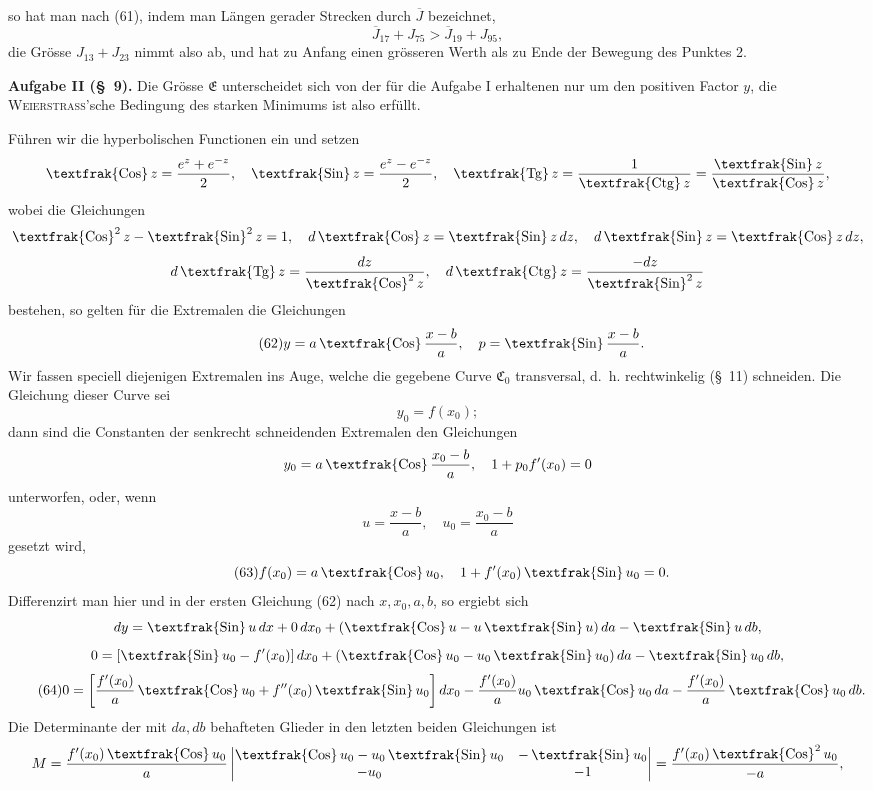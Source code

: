 \documentclass[11pt,a4paper,leqno]{article}
\newcommand{\Cof}{\mathop{\text{\textfrak{Cos}}}\nolimits}
\newcommand{\Sin}{\mathop{\text{\textfrak{Sin}}}\nolimits}
\newcommand{\Tg}{\mathop{\text{\textfrak{Tg}}}\nolimits}
\newcommand{\Ctg}{\mathop{\text{\textfrak{Ctg}}}\nolimits}
\begin{document}
 so hat man nach (61), indem man Längen gerader Strecken durch $\overline{J}$ bezeichnet,
\[
\overline{J}_{17}+J_{75}>\overline{J}_{19}+J_{95},
\]
die Grösse $J_{13}+J_{23}$ nimmt also ab, und hat zu Anfang einen grösseren Werth als zu Ende der Bewegung des Punktes 2.



\noindent\textbf{Aufgabe II (\S~9).} Die Grösse $\mathfrak{E}$ unterscheidet sich von der für die Aufgabe I erhaltenen nur um den positiven Factor $y$, die \textsc{Weierstrass}'sche Bedingung des starken Minimums ist also erfüllt.

Führen wir die hyperbolischen Functionen ein und setzen
\[
\Cof z=\frac{e^z+e^{-z}}{2},\quad
\Sin z=\frac{e^z-e^{-z}}{2},\quad
\Tg z=\frac{1}{\Ctg z}=\frac{\Sin z}{\Cof z},
\]
wobei die Gleichungen
\[
\Cof^2z-\Sin^2z=1,\quad
d\Cof z=\Sin z\,dz,\quad
d\Sin z=\Cof z\,dz,
\]
\[
d\Tg z=\frac{dz}{\Cof^2z},\quad
d\Ctg z=\frac{-dz}{\Sin^2z}
\]
bestehen, so gelten für die Extremalen die Gleichungen
\begin{equation}\tag{62}
y=a\Cof\frac{x-b}{a},\quad
p=\Sin\frac{x-b}{a}.
\end{equation}
Wir fassen speciell diejenigen Extremalen ins Auge, welche die gegebene Curve $\mathfrak{C}_0$ transversal, d.~h. rechtwinkelig (\S~11) schneiden. Die Gleichung dieser Curve sei
\[
y_0=f(x_0);
\]
dann sind die Constanten der senkrecht schneidenden Extremalen den Gleichungen
\[
y_0=a\Cof\frac{x_0-b}{a},\quad
1+p_0f'(x_0)=0
\]
unterworfen, oder, wenn
\[
u=\frac{x-b}{a},\quad u_0=\frac{x_0-b}{a}
\]
gesetzt wird,
\begin{equation}\tag{63}
f(x_0)=a\Cof u_0,\quad
1+f'(x_0)\Sin u_0=0.
\end{equation}
Differenzirt man hier und in der ersten Gleichung (62) nach $x,x_0,a,b$, so ergiebt sich
\[
dy=\Sin u\,dx+0\,dx_0+(\Cof u-u\Sin u)\,da-\Sin u\,db,
\]
\[
0=[\Sin u_0-f'(x_0)]\,dx_0+(\Cof u_0-u_0\Sin u_0)\,da-\Sin u_0\,db,
\]
\begin{equation}\tag{64}
0=
\left[\frac{f'(x_0)}{a}\Cof u_0+f''(x_0)\Sin u_0\right]dx_0
-\frac{f'(x_0)}{a}u_0\Cof u_0\,da
-\frac{f'(x_0)}{a}\Cof u_0\,db.
\end{equation}
Die Determinante der mit $da,db$ behafteten Glieder in den letzten beiden Gleichungen ist
\[
M=
\frac{f'(x_0)\Cof u_0}{a}
\begin{vmatrix}
\Cof u_0-u_0\Sin u_0 & -\Sin u_0\\
-u_0 & -1
\end{vmatrix}
=
\frac{f'(x_0)\Cof^2u_0}{-a},
\]
\end{document}
